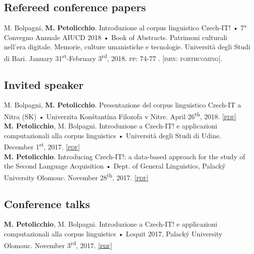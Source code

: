 \documentclass[10pt, a4paper]{article}
\newcommand{\pdf}[1]{\href{#1}{\scriptsize\textsc{[pdf]}}}
\newcommand{\isbn}[1]{{\scriptsize\textsc{[isbn: #1]}}}
\begin{document}
\subsection{Refereed conference papers}

M. Bolpagni, \textbf{M. Petolicchio}. Introduzione al corpus linguistico Czech-IT! • 7° Convegno Annuale AIUCD 2018 • Book of Abstracts. Patrimoni culturali nell'era digitale. Memorie, culture umanistiche e tecnologie. Università degli Studi di Bari. January 31\textsuperscript{st}-February 3\textsuperscript{rd}, 2018. \textsc{pp:} 74-77 . \isbn{forthcoming}.





\subsection{Invited speaker}


M. Bolpagni, \textbf{M. Petolicchio}. Presentazione del corpus linguistico Czech-IT a Nitra (SK) •  Univerzita Konštantína Filozofa v Nitre. April 26\textsuperscript{th}, 2018. \pdf{https://www.researchgate.net/publication/327222171_Presentazione_del_corpus_linguistico_Czech-IT_a_Nitra_SK} \\

\textbf{M. Petolicchio}, M. Bolpagni. Introduzione a Czech-IT! e applicazioni computazionali alla corpus linguistics • Università degli Studi di Udine. December 1\textsuperscript{st}, 2017. \pdf{http://www.academia.edu/35315516/_UniUD_1_12_2017_Introduzione_a_Czech-IT_e_applicazioni_computazionali_alla_corpus_linguistics} \\

\textbf{M. Petolicchio}. Introducing Czech-IT!: a data-based approach for the study of the Second Language Acquisition • Dept. of General Linguistics, Palacký University Olomouc. November 28\textsuperscript{th}, 2017. \pdf{http://www.academia.edu/35278761/Introducing_Czech-IT_a_data-based_approach_for_the_study_of_the_Second_Language_Acquisition} 


\subsection{Conference talks}



\textbf{M. Petolicchio}, M. Bolpagni. Introduzione a Czech-IT! e applicazioni computazionali alla corpus linguistics • Loquit 2017, Palacký University Olomouc. November 3\textsuperscript{rd}, 2017. \pdf{http://www.academia.edu/35256167/Introduzione_a_Czech-IT_e_applicazioni_computazionali_alla_corpus_linguistics} \\
\end{document}

